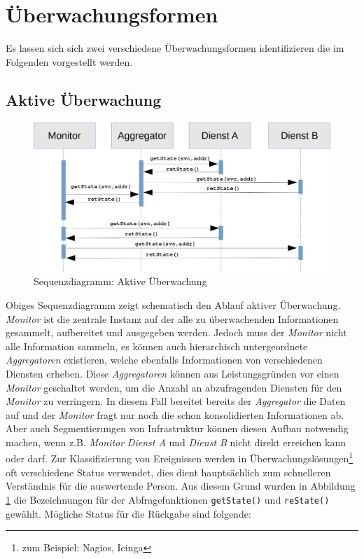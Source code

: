 \section{Überwachungsformen}

Es lassen sich sich zwei verschiedene Überwachungsformen identifizieren die im Folgenden 
vorgestellt werden.

\subsection{Aktive Überwachung}
\begin{figure}[htbp]
    \centering
    \includegraphics[scale=0.36]{img/sequence_uml_active_trans}
    \caption{Sequenzdiagramm: Aktive Überwachung}
    \label{aktiv}
\end{figure}

Obiges Sequenzdiagramm zeigt schematisch den Ablauf aktiver Überwachung. \emph{Monitor} 
ist die zentrale Instanz auf der alle zu überwachenden Informationen gesammelt, 
aufbereitet und ausgegeben werden. Jedoch muss der \emph{Monitor} nicht alle Information
sammeln, es können auch hierarchisch untergeordnete \emph{Aggregatoren} existieren, 
welche ebenfalls Informationen von verschiedenen Diensten erheben. Diese 
\emph{Aggregatoren} können aus Leistungsgründen vor einen \emph{Monitor} geschaltet 
werden, um die Anzahl an abzufragenden Diensten für den \emph{Monitor} zu verringern. In 
diesem Fall bereitet bereits der \emph{Aggregator} die Daten auf und der \emph{Monitor} 
fragt nur noch die schon konsolidierten Informationen ab. Aber auch Segmentierungen von 
Infrastruktur können diesen Aufbau notwendig machen, wenn z.B. \emph{Monitor} 
\emph{Dienst A} und \emph{Dienst B} nicht direkt erreichen kann oder darf. Zur 
Klassifizierung von Ereignissen werden in Überwachungslösungen\footnote{zum Beispiel: 
Nagios, Icinga} oft verschiedene Status verwendet, dies dient hauptsächlich zum 
schnelleren Verständnis für die auswertende Person. Aus diesem Grund wurden in 
Abbildung \ref{aktiv} die Bezeichnungen für der Abfragefunktionen \texttt{getState()} und 
\texttt{reState()} gewählt. Mögliche Status für die Rückgabe sind folgende:

